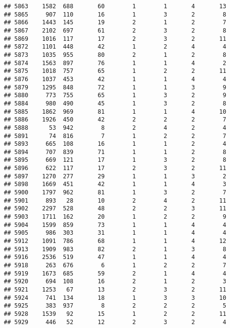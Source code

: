 \documentclass[]{article}
\begin{document}
\begin{verbatim}
## 5863    1582  688       60        1        1       4       13
## 5865     907  110       16        1        3       2        8
## 5866    1443  145       19        2        1       2        7
## 5867    2102  697       61        2        3       2        8
## 5869    1016  117       17        2        3       2       11
## 5872    1101  448       42        1        2       4        4
## 5873    1035  955       80        2        1       2        8
## 5874    1563  897       76        1        1       4        2
## 5875    1018  757       65        1        2       2       11
## 5876    1037  453       42        1        1       4        4
## 5879    1295  848       72        1        1       3        9
## 5880     773  755       65        1        3       2        9
## 5884     980  490       45        1        3       2        8
## 5885    1862  969       81        1        1       4       10
## 5886    1926  450       42        2        2       2        7
## 5888      53  942        8        2        4       2        4
## 5891      74  816        7        1        2       2        7
## 5893     665  108       16        1        1       2        4
## 5894     707  839       71        1        1       2        8
## 5895     669  121       17        1        3       2        8
## 5896     622  117       17        2        3       2       11
## 5897    1270  277       29        1        1       3        2
## 5898    1669  451       42        1        1       4        3
## 5900    1797  962       81        1        3       2        7
## 5901     893   28       10        2        4       2       11
## 5902    2297  528       48        2        2       3       11
## 5903    1711  162       20        1        2       2        9
## 5904    1599  859       73        1        1       4        4
## 5905     986  303       31        1        1       4        4
## 5912    1091  786       68        1        1       4       12
## 5913    1909  983       82        2        1       3        8
## 5916    2536  519       47        1        1       4        4
## 5918     263  676        6        1        2       2        7
## 5919    1673  685       59        2        1       4        4
## 5920     694  108       16        2        1       2        3
## 5921    1253   67       13        2        3       2       11
## 5924     741  134       18        1        3       3       10
## 5925     383  937        8        2        2       2        5
## 5928    1539   92       15        1        2       2       11
## 5929     446   52       12        2        3       2        4

\end{verbatim}
\end{document}
